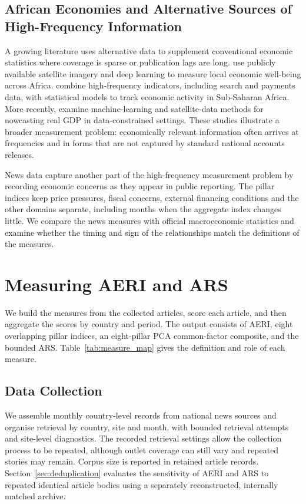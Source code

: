\documentclass[12pt]{article}
\begin{document}
\subsection{African Economies and Alternative Sources of High-Frequency Information}
A growing literature uses alternative data to supplement conventional economic statistics where coverage is sparse or publication lags are long. \citet{yeh2020} use publicly available satellite imagery and deep learning to measure local economic well-being across Africa. \citet{buell2021} combine high-frequency indicators, including search and payments data, with statistical models to track economic activity in Sub-Saharan Africa. More recently, \citet{fotopoulou2026} examine machine-learning and satellite-data methods for nowcasting real GDP in data-constrained settings. These studies illustrate a broader measurement problem: economically relevant information often arrives at frequencies and in forms that are not captured by standard national accounts releases.

News data capture another part of the high-frequency measurement problem by recording economic concerns as they appear in public reporting. The pillar indices keep price pressures, fiscal concerns, external financing conditions and the other domains separate, including months when the aggregate index changes little. We compare the news measures with official macroeconomic statistics and examine whether the timing and sign of the relationships match the definitions of the measures.
\section{Measuring AERI and ARS}\label{sec:methodology}
We build the measures from the collected articles, score each article, and then aggregate the scores by country and period. The output consists of AERI, eight overlapping pillar indices, an eight-pillar PCA common-factor composite, and the bounded ARS. Table~\ref{tab:measure_map} gives the definition and role of each measure.

\subsection{Data Collection}\label{sec:data_collection}
We assemble monthly country-level records from national news sources and organise retrieval by country, site and month, with bounded retrieval attempts and site-level diagnostics. The recorded retrieval settings allow the collection process to be repeated, although outlet coverage can still vary and repeated stories may remain. Corpus size is reported in retained article records. Section~\ref{sec:deduplication} evaluates the sensitivity of AERI and ARS to repeated identical article bodies using a separately reconstructed, internally matched archive.
\end{document}
